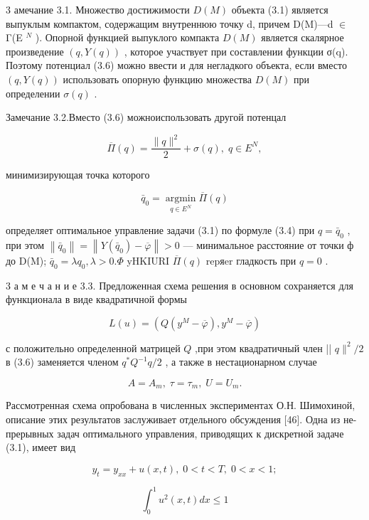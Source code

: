 \documentclass[10pt]{article}
\begin{document}
3 амечание 3.1. Множество достижимости \(D\left( M\right)\) объекта (3.1) является выпуклым компактом, содержащим внутреннюю точку d, причем D(M)—d \(\in\) Γ(E \({}^{N}\) ). Опорной функцией выпуклого компакта \(D\left( M\right)\) является скалярное произведение \(\left( {q,Y\left( q\right) }\right)\) , которое участвует при составлении функции σ(q). Поэтому потенциал (3.6) можно ввести и для негладкого объекта, если вместо \(\left( {q,Y\left( q\right) }\right)\) использовать опорную функцию множества \(D\left( M\right)\) при определении \(\sigma \left( q\right)\) .

Замечание 3.2.Вместо (3.6) можноиспользовать другой потенцал

\[
\overline{\Pi }\left( q\right)  = \frac{\parallel q{\parallel }^{2}}{2} + \sigma \left( q\right) ,\;q \in  {E}^{N},
\]

минимизирующая точка которого

\[
{\bar{q}}_{0} = \mathop{\operatorname{argmin}}\limits_{{q \in  {E}^{N}}}\overline{\Pi }\left( q\right)
\]

определяет оптимальное управление задачи (3.1) по формуле (3.4) при \(q = {\bar{q}}_{0}\) , при этом \(\left\lVert {\bar{q}}_{0} \right\rVert = \left\lVert {Y\left( {\bar{q}}_{0}\right)  - \overline{\varphi }} \right\rVert > 0\) — минимальное расстояние от точки ф до D(M); \({\bar{q}}_{0} = \lambda {q}_{0},\lambda  > 0.\Phi\) yHKIURI \(\overline{\Pi }\left( q\right)\) repяer гладкость при \(q = 0\) .

3 а м е ч а н и е 3.3. Предложенная схема решения в основном сохраняется для функционала в виде квадратичной формы

\[
L\left( u\right)  = \left( {Q\left( {{y}^{M} - \overline{\varphi }}\right) ,{y}^{M} - \overline{\varphi }}\right)
\]

с положительно определенной матрицей \(Q\) ,при этом квадратичный член || \(q{ \parallel  }^{2}/2\) в (3.6) заменяется членом \({q}^{ * }{Q}^{-1}q/2\) , а также в нестационарном случае

\[
A = {A}_{m},\;\tau  = {\tau }_{m},\;U = {U}_{m}.
\]

Рассмотренная схема опробована в численных экспериментах О.Н. Шимохиной, описание этих результатов заслуживает отдельного обсуждения [46]. Одна из не- прерывных задач оптимального управления, приводящих к дискретной задаче (3.1), имеет вид

\[
{y}_{t} = {y}_{xx} + u\left( {x,t}\right) ,\;0 < t < T,\;0 < x < 1;
\]

\[
{\int }_{0}^{1}{u}^{2}\left( {x,t}\right) {dx} \leq  1
\]
\end{document}
